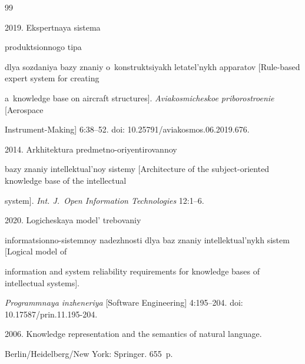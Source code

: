 {\small\frenchspacing

{%


\begin{thebibliography}{99}


 2019. Ekspertnaya sis\-te\-ma 

pro\-duk\-tsi\-on\-no\-go tipa 

dlya so\-zda\-niya bazy zna\-niy o~konstruktsiyakh le\-ta\-tel'\-nykh ap\-pa\-ra\-tov [Rule-based expert system for creating 

a~knowledge base on aircraft structures]. \textit{Aviakosmicheskoe priborostroenie} [Aerospace

 Instrument-Making] 6:38--52. doi: 10.25791\!/\!aviakosmos.06.2019.676.





 2014. Arkhitektura predmetno-oriyentirovannoy 

ba\-zy znaniy in\-tel\-lek\-tu\-al'\-noy sis\-te\-my [Architecture of the subject-oriented knowledge base of the intellectual 

system]. \textit{Int. J.~Open Information Technologies} 12:1--6. 




 2020. Lo\-gi\-che\-skaya model' tre\-bo\-va\-niy 

informatsionno-sistemnoy na\-dezh\-nosti dlya baz zna\-niy in\-tel\-lek\-tu\-al'\-nykh sis\-tem [Logical model of 

information and system reliability requirements for knowledge bases of intellectual systems]. 

\textit{Programmnaya inzheneriya} [Software Engineering] 4:195--204. doi: 10.17587\!/\!prin.11.195-204.




 2006. Knowledge representation and the semantics of natural language. 

Berlin/Heidelberg/New York: Springer. 655~p.



\end{thebibliography}}}
